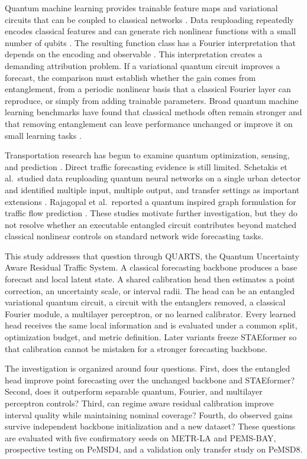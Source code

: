 \documentclass[pdflatex,sn-mathphys-num]{sn-jnl}
\begin{document}
Quantum machine learning provides trainable feature maps and variational circuits that can be coupled to classical networks \cite{biamonte2017qml,cerezo2021vqa}. Data reuploading repeatedly encodes classical features and can generate rich nonlinear functions with a small number of qubits \cite{perezsalinas2020reuploading}. The resulting function class has a Fourier interpretation that depends on the encoding and observable \cite{schuld2021encoding}. This interpretation creates a demanding attribution problem. If a variational quantum circuit improves a forecast, the comparison must establish whether the gain comes from entanglement, from a periodic nonlinear basis that a classical Fourier layer can reproduce, or simply from adding trainable parameters. Broad quantum machine learning benchmarks have found that classical methods often remain stronger and that removing entanglement can leave performance unchanged or improve it on small learning tasks \cite{bowles2024benchmark}.

Transportation research has begun to examine quantum optimization, sensing, and prediction \cite{usdot2024quantum,mohammed2025annealingreview}. Direct traffic forecasting evidence is still limited. Schetakis et al.\ studied data reuploading quantum neural networks on a single urban detector and identified multiple input, multiple output, and transfer settings as important extensions \cite{schetakis2025trafficqnn}. Rajagopal et al.\ reported a quantum inspired graph formulation for traffic flow prediction \cite{rajagopal2025mthqgnn}. These studies motivate further investigation, but they do not resolve whether an executable entangled circuit contributes beyond matched classical nonlinear controls on standard network wide forecasting tasks.

This study addresses that question through QUARTS, the Quantum Uncertainty Aware Residual Traffic System. A classical forecasting backbone produces a base forecast and local latent state. A shared calibration head then estimates a point correction, an uncertainty scale, or interval radii. The head can be an entangled variational quantum circuit, a circuit with the entanglers removed, a classical Fourier module, a multilayer perceptron, or no learned calibrator. Every learned head receives the same local information and is evaluated under a common split, optimization budget, and metric definition. Later variants freeze STAEformer so that calibration cannot be mistaken for a stronger forecasting backbone.

The investigation is organized around four questions. First, does the entangled head improve point forecasting over the unchanged backbone and STAEformer? Second, does it outperform separable quantum, Fourier, and multilayer perceptron controls? Third, can regime aware residual calibration improve interval quality while maintaining nominal coverage? Fourth, do observed gains survive independent backbone initialization and a new dataset? These questions are evaluated with five confirmatory seeds on METR-LA and PEMS-BAY, prospective testing on PeMSD4, and a validation only transfer study on PeMSD8.
\end{document}
